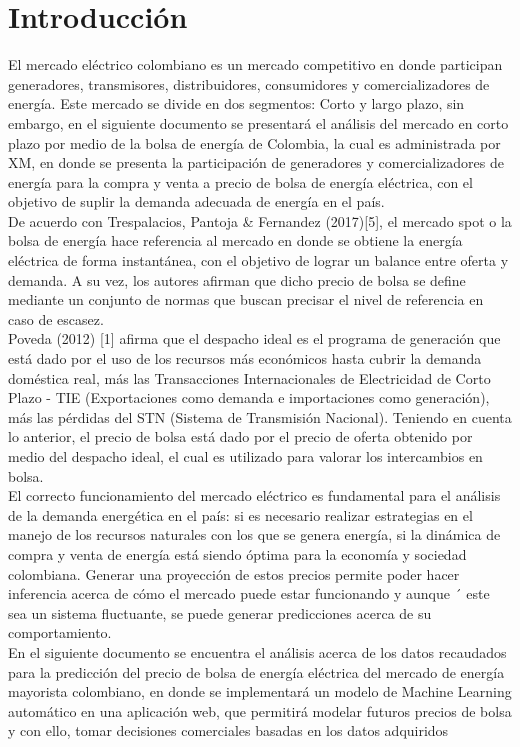 \documentclass[conference, 10pt]{IEEEtran}
\begin{document}
\section{Introducción}
El mercado eléctrico colombiano es un mercado competitivo en donde participan generadores, transmisores, distribuidores, consumidores y comercializadores de energía. Este mercado se divide en dos segmentos: Corto y largo plazo, sin embargo, en el siguiente documento se presentará el análisis del mercado en corto plazo por medio de la bolsa de energía de Colombia, la cual es administrada por XM, en donde se presenta la participación de generadores y comercializadores de energía para la compra y venta a precio de bolsa de energía eléctrica, con el objetivo de suplir la demanda adecuada de energía en el país.\\
De acuerdo con Trespalacios, Pantoja & Fernandez (2017)[5], el mercado spot o la bolsa de energía hace referencia al mercado en donde se obtiene la energía eléctrica de forma instantánea, con el objetivo de lograr un balance entre oferta  y demanda. A su vez, los autores afirman que dicho precio de bolsa se define mediante un conjunto de normas que buscan precisar el nivel de referencia en caso de escasez.\\
Poveda (2012) [1] afirma que el despacho ideal es el programa de generación que está dado por el uso de los recursos más económicos hasta cubrir la demanda doméstica real, más las Transacciones Internacionales de Electricidad de Corto Plazo - TIE (Exportaciones como demanda e importaciones como generación), más las pérdidas del STN (Sistema de Transmisión Nacional). Teniendo en cuenta lo anterior, el precio de bolsa está dado por el precio de oferta obtenido por medio del despacho ideal, el cual es utilizado para valorar los intercambios en bolsa.\\
El correcto funcionamiento del mercado eléctrico es fundamental para el análisis de la demanda energética en el país: si es necesario realizar estrategias en el manejo de los recursos naturales con los que se genera energía, si la dinámica de compra y venta de energía está siendo óptima para la economía y sociedad colombiana. Generar una proyección de estos precios permite poder hacer inferencia acerca de cómo el mercado puede estar funcionando y aunque ´ este sea un sistema fluctuante, se puede generar predicciones acerca de su comportamiento.\\

En el siguiente documento se encuentra el análisis acerca de los datos recaudados para la predicción del precio de bolsa de energía eléctrica del mercado de energía mayorista colombiano, en donde se implementará un modelo de Machine Learning automático en una aplicación web, que permitirá modelar futuros precios de bolsa y con ello, tomar decisiones comerciales basadas en los datos adquiridos
\end{document}

